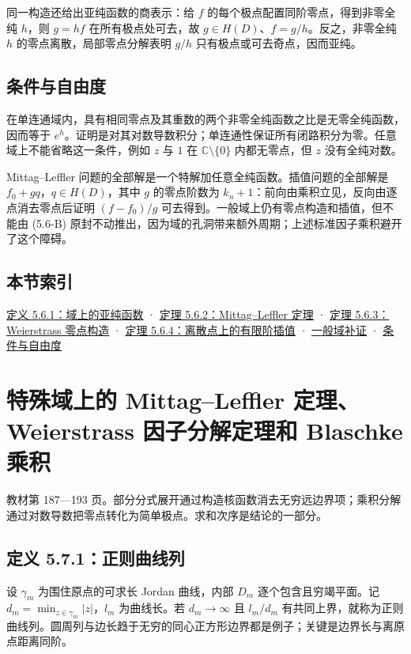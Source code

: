 \documentclass[11pt,a4paper]{article}
\begin{document}
同一构造还给出亚纯函数的商表示：给 \(f\)
的每个极点配置同阶零点，得到非零全纯 \(h\)，则 \(g=hf\)
在所有极点处可去，故 \(g\in H(D)\)、\(f=g/h\)。反之，非零全纯 \(h\)
的零点离散，局部零点分解表明 \(g/h\) 只有极点或可去奇点，因而亚纯。

\subsection{条件与自由度}\label{ch05-s6-heading-6}

在单连通域内，具有相同零点及其重数的两个非零全纯函数之比是无零全纯函数，因而等于
\(e^h\)。证明是对其对数导数积分；单连通性保证所有闭路积分为零。任意域上不能省略这一条件，例如
\(z\) 与 \(1\) 在 \(\mathbb C\setminus\{0\}\) 内都无零点，但 \(z\)
没有全纯对数。

Mittag--Leffler 问题的全部解是一个特解加任意全纯函数。插值问题的全部解是
\(f_0+gq\)，\(q\in H(D)\)，其中 \(g\) 的零点阶数为
\(k_n+1\)：前向由乘积立见，反向由逐点消去零点后证明 \((f-f_0)/g\)
可去得到。一般域上仍有零点构造和插值，但不能由 (5.6-B)
原封不动推出，因为域的孔洞带来额外周期；上述标准因子乘积避开了这个障碍。

\subsection{本节索引}\label{ch05-s6-heading-7}

\hyperref[ch05-s6-heading-1]{定义 5.6.1：域上的亚纯函数} ·
\hyperref[ch05-s6-heading-2]{定理 5.6.2：Mittag--Leffler 定理} ·
\hyperref[ch05-s6-heading-3]{定理 5.6.3：Weierstrass 零点构造} ·
\hyperref[ch05-s6-heading-4]{定理 5.6.4：离散点上的有限阶插值} ·
\hyperref[ch05-s6-heading-5]{一般域补证} · \hyperref[ch05-s6-heading-6]{条件与自由度}

\section{特殊域上的 Mittag–Leffler 定理、Weierstrass 因子分解定理和 Blaschke 乘积}
教材第 187---193
页。部分分式展开通过构造核函数消去无穷远边界项；乘积分解通过对数导数把零点转化为简单极点。求和次序是结论的一部分。

\subsection{定义 5.7.1：正则曲线列}\label{ch05-s7-heading-1}

设 \(\gamma_m\) 为围住原点的可求长 Jordan 曲线，内部 \(D_m\)
逐个包含且穷竭平面。记 \(d_m=\min_{z\in\gamma_m}|z|\)，\(l_m\)
为曲线长。若 \(d_m\to\infty\) 且 \(l_m/d_m\)
有共同上界，就称为正则曲线列。圆周列与边长趋于无穷的同心正方形边界都是例子；关键是边界长与离原点距离同阶。
\end{document}
